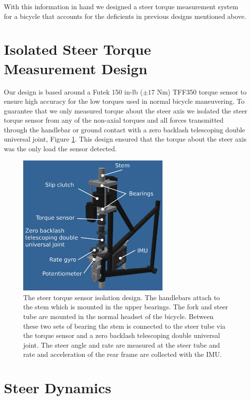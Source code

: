 \documentclass[a4paper]{article}
\begin{document}
With this information in hand we designed a steer torque measurement system for
a bicycle that accounts for the deficients in previous designs mentioned above.

\section*{Isolated Steer Torque Measurement Design}

Our design is based around a Futek 150 in-lb ($\pm 17$ Nm) TFF350 torque sensor
to ensure high accuracy for the low torques used in normal bicycle maneuvering.
To guarantee that we only measured torque about the steer axis we isolated the
steer torque sensor from any of the non-axial torques and all forces
transmitted through the handlebar or ground contact with a zero backlash
telescoping double universal joint, Figure \ref{fig:steer-torque-design}. This
design ensured that the torque about the steer axis was the only load the
sensor detected.

\begin{figure}
  \centering
  \includegraphics[width=3in]{figures/steer-torque-design.png}
  \caption{The steer torque sensor isolation design. The handlebars attach to
    the stem which is mounted in the upper bearings. The fork and steer tube
    are mounted in the normal headset of the bicycle. Between these two sets of
    bearing the stem is connected to the steer tube via the torque sensor and a
    zero backlash telescoping double universal joint. The steer angle and rate
    are measured at the steer tube and rate and acceleration of the rear frame
    are collected with the IMU.}
  \label{fig:steer-torque-design}
\end{figure}

\section*{Steer Dynamics}
\label{sec:steer-dynamics}
\end{document}
